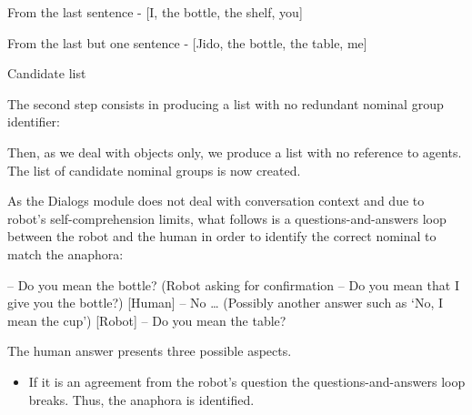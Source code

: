 \documentclass[twoside,a4paper,10pt]{report}
\begin{document}
\small
\begin{verbatimtab}
   From the last sentence - [I, the bottle, the shelf, you] 
\end{verbatimtab}
\normalsize

\small
\begin{verbatimtab}
   From the last but one sentence - [Jido, the bottle, the table, me]
\end{verbatimtab}
\normalsize

Candidate list


\small
\begin{verbatimtab}
\end{verbatimtab}
\normalsize

The second step consists in producing a list with no redundant nominal group identifier:


\small
\begin{verbatimtab}
\end{verbatimtab}
\normalsize

Then, as we deal with objects only, we produce a list with no reference to agents. The list of candidate nominal groups is now created.


\small
\begin{verbatimtab}
\end{verbatimtab}
\normalsize

As the Dialogs module does not deal with conversation context and due to robot’s self-comprehension limits, what follows is a questions-and-answers loop between the robot and the human in order to identify the correct nominal to match the anaphora: 


\small
\begin{verbatimtab}
  [Robot] – Do you mean the bottle? (Robot asking for confirmation – Do you mean that I give you
the bottle?)
  [Human] – No … (Possibly another answer such as ‘No, I mean the cup’)
  [Robot] – Do you mean the table?
\end{verbatimtab}
\normalsize

The human answer presents three possible aspects.


\begin{itemize}
    \item  If it is an agreement from the robot’s question the questions-and-answers loop breaks. Thus, the anaphora is identified.
\end{itemize}
\end{document}
